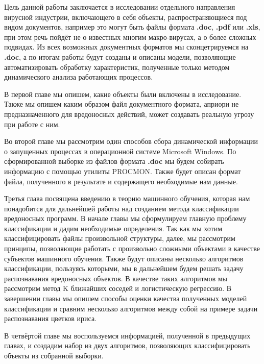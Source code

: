 Цель данной работы заключается в исследовании отдельного направления вирусной индустрии, включающего в себя объекты, распространяющиеся под видом документов, например это могут быть файлы формата \textbf{.doc}, \textbf{.pdf} или \textbf{.xls}, при этом речь пойдёт не о известных многим макро-вирусах, а о более сложных подвидах.
Из всех возможных документных форматов мы сконцетрируемся на \textbf{.doc}, а по итогам работы будут созданы и описаны модели, позволяющие автоматизировать обработку характеристик, полученные только методом динамического анализа работающих процессов.

В первой главе мы опишем, какие объекты были включены в исследование.
Также мы опишем каким образом файл документного формата, априори не предназначенного для вредоносных действий, может создавать реальную угрозу при работе с ним.

Во второй главе мы рассмотрим один способов сбора динамической информации о запущенных процессах в операционной системе Microsoft Windows. 
По сформированной выборке из файлов формата \textbf{.doc} мы будем собирать информацию с помощью утилиты PROCMON.
Также будет описан формат файла, полученного в результате и содержащего необходимые нам данные.

Третья глава посвящена введению в теорию машинного обучения, которая нам понадобится для дальнейшей работы над созданием метода классификации вредоносных программ. В начале главы мы сформулируем главную проблему классификации и дадим необходимые определения. Так как мы хотим классифицировать файлы произвольной структуры, далее, мы рассмотрим принципы, позволяющие работать с произвольно сложными объектами в качестве субъектов машинного обучения. Также будут описаны несколько алгоритмов классификации, пользуясь которыми, мы в дальнейшем будем решать задачу распознавания вредоносных объектов. В качестве таких алгоритмов мы рассмотрим метод K ближайших соседей и логистическую регрессию.  В завершении главы мы опишем способы оценки качества полученных моделей классификации и сравним несколько алгоритмов между собой на примере задачи распознавания цветков ириса.

В четвёртой главе мы воспользуемся информацией, полученной в предыдущих главах, и создадим набор из двух алгоритмов, позволяющих классифицировать объекты из собранной выборки.

